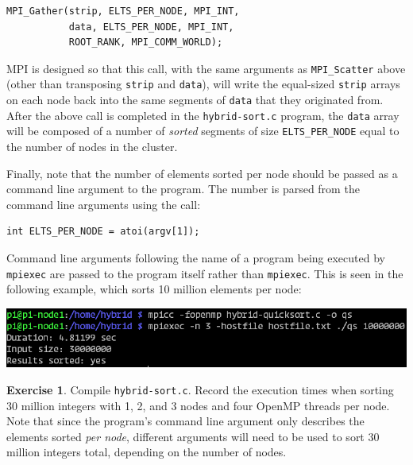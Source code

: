 \documentclass{article}
\theoremstyle{definition}
\newtheorem{exercise}{Exercise}
\begin{document}
\begin{verbatim}
MPI_Gather(strip, ELTS_PER_NODE, MPI_INT,
           data, ELTS_PER_NODE, MPI_INT,
           ROOT_RANK, MPI_COMM_WORLD);
\end{verbatim}

MPI is designed so that this call, with the same arguments as \texttt{MPI\_Scatter} above (other than transposing \texttt{strip} and \texttt{data}), will write the equal-sized \texttt{strip} arrays on each node back into the same segments of \texttt{data} that they originated from. After the above call is completed in the \texttt{hybrid-sort.c} program, the \texttt{data} array will be composed of a number of \emph{sorted} segments of size \texttt{ELTS\_PER\_NODE} equal to the number of nodes in the cluster.

Finally, note that the number of elements sorted per node should be passed as a command line argument to the program. The number is parsed from the command line arguments using the call:

\begin{verbatim}
int ELTS_PER_NODE = atoi(argv[1]);
\end{verbatim}

Command line arguments following the name of a program being executed by \texttt{mpiexec} are passed to the program itself rather than \texttt{mpiexec}. This is seen in the following example, which sorts 10 million elements per node:

\includegraphics[width=\textwidth]{images/hybrid-sort-output.png}

\begin{exercise}
Compile \texttt{hybrid-sort.c}. Record the execution times when sorting 30 million integers with 1, 2, and 3 nodes and four OpenMP threads per node. Note that since the program's command line argument only describes the elements sorted \emph{per node}, different arguments will need to be used to sort 30 million integers total, depending on the number of nodes.
\end{exercise}
\end{document}
